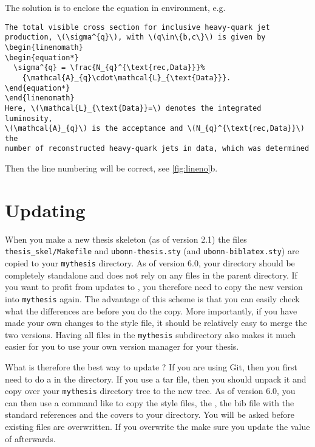 The solution is to enclose the equation in  environment, e.g.
\begin{verbatim}
The total visible cross section for inclusive heavy-quark jet
production, \(\sigma^{q}\), with \(q\in\{b,c\}\) is given by
\begin{linenomath}
\begin{equation*}
  \sigma^{q} = \frac{N_{q}^{\text{rec,Data}}}%
    {\mathcal{A}_{q}\cdot\mathcal{L}_{\text{Data}}}.
\end{equation*}
\end{linenomath}
Here, \(\mathcal{L}_{\text{Data}}=\) denotes the integrated luminosity,
\(\mathcal{A}_{q}\) is the acceptance and \(N_{q}^{\text{rec,Data}}\) the
number of reconstructed heavy-quark jets in data, which was determined
\end{verbatim}
\noindent
Then the line numbering will be correct, see \cref{fig:lineno}b.


\section{Updating }%
\label{sec:tips:update}

When you make a new thesis skeleton (as of version 2.1) the files
\texttt{thesis\_skel/Makefile} and \texttt{ubonn-thesis.sty}
(and \texttt{ubonn-biblatex.sty}) are copied
to your \texttt{mythesis} directory.
As of version 6.0, your  directory should be completely standalone
and does not rely on any files in the parent directory.
If you want to profit from updates to ,
you therefore need to copy the new version into \texttt{mythesis} again.
The advantage of this scheme is
that you can easily check what the differences are before you do the
copy. More importantly, if you have made your own changes to the style
file, it should be relatively easy to merge the two versions. Having
all files in the \texttt{mythesis} subdirectory also makes it much easier
for you to use your own version manager for your thesis.

What is therefore the best way to update ?
If you are using Git, then you first need to do a 
in the  directory.
If you use a tar file, then you should unpack it and copy over your
\texttt{mythesis} directory tree to the new  tree.
As of version 6.0, you can then use a command like
 to copy the style files,
the , the bib file with the standard references and the covers to your
 directory.
You will be asked before existing files are overwritten.
If you overwrite the  make sure you update the value of  afterwards.

